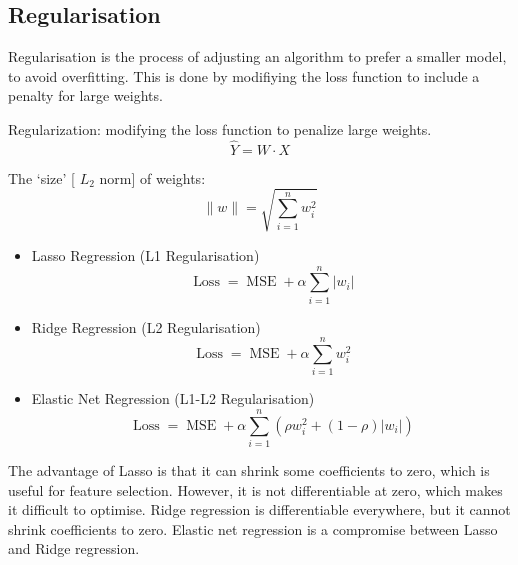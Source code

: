 \documentclass[12pt,a4paper]{article}
\begin{document}
\subsection{Regularisation}
Regularisation is the process of adjusting an algorithm to prefer a smaller model, to avoid overfitting. This is done by modifiying the loss function to include a penalty for large weights.

Regularization: modifying the loss function to penalize large weights.
\begin{equation*}
\hat{Y}=W \cdot X
\end{equation*}

The `size' [ $L_2$ norm] of weights:
\begin{equation*}
\|w\|=\sqrt{\sum_{i=1}^n w_i^2}
\end{equation*}


\begin{itemize}
    \item Lasso Regression (L1 Regularisation)
    $$
    \operatorname{Loss}=\operatorname{MSE}+\alpha \sum_{i=1}^n\left|w_i\right|
    $$
    \item Ridge Regression (L2 Regularisation)
    $$
    \operatorname{Loss}=\operatorname{MSE}+\alpha \sum_{i=1}^n w_i^2
    $$
    \item Elastic Net Regression (L1-L2 Regularisation)
    $$
    \operatorname{Loss}=\operatorname{MSE}+\alpha \sum_{i=1}^n\left(\rho w_i^2+\left(1-\rho\right)\left|w_i\right|\right)
    $$ 
\end{itemize}

The advantage of Lasso is that it can shrink some coefficients to zero, which is useful for feature selection. However, it is not differentiable at zero, which makes it difficult to optimise. Ridge regression is differentiable everywhere, but it cannot shrink coefficients to zero. Elastic net regression is a compromise between Lasso and Ridge regression.
\end{document}

